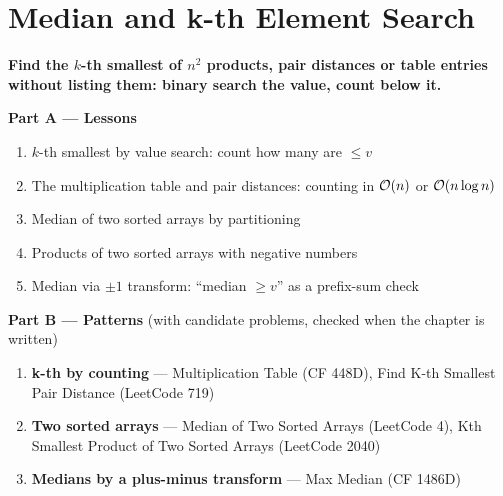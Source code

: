 \chapter{Median and k-th Element Search}
\label{ch:kth}

\begin{tcolorbox}[enhanced, colback=white, colframe=secondaryblue, boxrule=1pt, arc=2mm]
\textbf{\large\textcolor{primaryblue}{Find the $k$-th smallest of $n^2$ products, pair distances or table entries without listing them: binary search the value, count below it.}}
\end{tcolorbox}


\begin{plannedbox}
\textbf{Part A --- Lessons}
\begin{enumerate}[leftmargin=*, label=\textbf{A\arabic*.}, itemsep=1pt]
    \item $k$-th smallest by value search: count how many are $\le v$
    \item The multiplication table and pair distances: counting in $\mathcal{O}(n)$ or $\mathcal{O}(n\log n)$
    \item Median of two sorted arrays by partitioning
    \item Products of two sorted arrays with negative numbers
    \item Median via $\pm 1$ transform: ``median $\ge v$'' as a prefix-sum check
\end{enumerate}
\textbf{Part B --- Patterns} (with candidate problems, checked when the chapter is written)
\begin{enumerate}[leftmargin=*, label=\textbf{P\arabic*.}, itemsep=1pt]
    \item \textbf{k-th by counting} --- Multiplication Table {\small\color{darkgray}(CF 448D)}, Find K-th Smallest Pair Distance {\small\color{darkgray}(LeetCode 719)}
    \item \textbf{Two sorted arrays} --- Median of Two Sorted Arrays {\small\color{darkgray}(LeetCode 4)}, Kth Smallest Product of Two Sorted Arrays {\small\color{darkgray}(LeetCode 2040)}
    \item \textbf{Medians by a plus-minus transform} --- Max Median {\small\color{darkgray}(CF 1486D)}
\end{enumerate}
\end{plannedbox}
